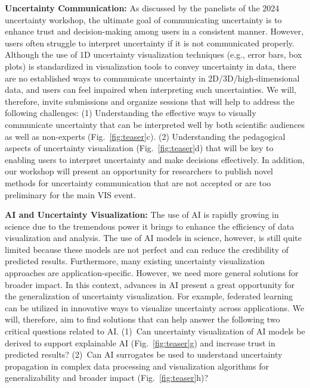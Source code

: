 \textbf{Uncertainty Communication:} As discussed by the panelists of the 2024 uncertainty workshop, the ultimate goal of communicating uncertainty is to enhance trust and decision-making among users in a consistent manner.  However, users often struggle to interpret uncertainty if it is not communicated properly. Although the use of 1D uncertainty visualization techniques (e.g., error bars, box plots) is standardized in visualization tools to convey uncertainty in data, there are no established ways to communicate uncertainty in 2D/3D/high-dimensional data, and users can feel impaired when interpreting such uncertainties. We will, therefore, invite submissions and organize sessions that will help to address the following challenges: (1) Understanding the effective ways to visually communicate uncertainty that can be interpreted well by both scientific audiences as well as non-experts (Fig.\ \ref{fig:teaser}c). (2) Understanding the pedagogical aspects of uncertainty visualization (Fig.\ \ref{fig:teaser}d) that will be key to enabling users to interpret uncertainty and make decisions effectively. In addition, our workshop will present an opportunity for researchers to publish novel methods for uncertainty communication that are not accepted or are too preliminary for the main VIS event. 

\textbf{AI and Uncertainty Visualization:} The use of AI is rapidly growing in science due to the tremendous power it brings to enhance the efficiency of data visualization and analysis. The use of AI models in science, however, is still quite limited because these models are not perfect and can reduce the credibility of predicted results. Furthermore, many existing uncertainty visualization approaches are application-specific. However, we need more general solutions for broader impact. In this context, advances in AI present a great opportunity for the generalization of uncertainty visualization. For example, federated learning can be utilized in innovative ways to visualize uncertainty across applications. We will, therefore, aim to find solutions that can help answer the following two critical questions related to AI. (1)~Can uncertainty visualization of AI models be derived to support explainable AI (Fig.\ \ref{fig:teaser}g) and increase trust in predicted results? (2)~Can AI surrogates be used to understand uncertainty propagation in complex data processing and visualization algorithms for generalizability and broader impact (Fig.\ \ref{fig:teaser}h)?  


